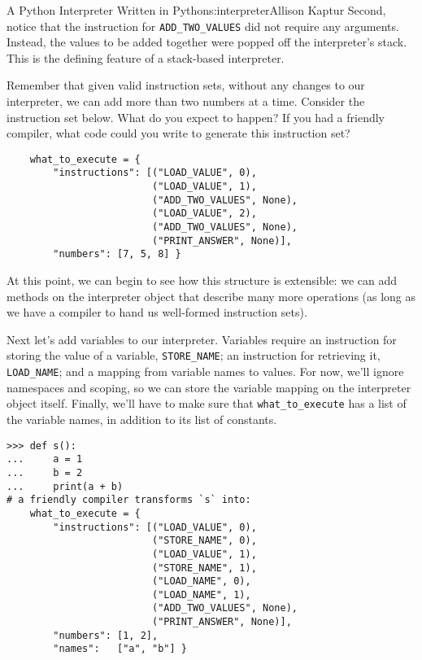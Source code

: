 \begin{aosachapter}{A Python Interpreter Written in Python}{s:interpreter}{Allison Kaptur}
Second, notice that the instruction for \texttt{ADD\_TWO\_VALUES} did
not require any arguments. Instead, the values to be added together were
popped off the interpreter's stack. This is the defining feature of a
stack-based interpreter.

Remember that given valid instruction sets, without any changes to our
interpreter, we can add more than two numbers at a time. Consider the
instruction set below. What do you expect to happen? If you had a
friendly compiler, what code could you write to generate this
instruction set?

\begin{verbatim}
    what_to_execute = {
        "instructions": [("LOAD_VALUE", 0),
                         ("LOAD_VALUE", 1),
                         ("ADD_TWO_VALUES", None),
                         ("LOAD_VALUE", 2),
                         ("ADD_TWO_VALUES", None),
                         ("PRINT_ANSWER", None)],
        "numbers": [7, 5, 8] }
\end{verbatim}

At this point, we can begin to see how this structure is extensible: we
can add methods on the interpreter object that describe many more
operations (as long as we have a compiler to hand us well-formed
instruction sets).

\label{variables}

Next let's add variables to our interpreter. Variables require an
instruction for storing the value of a variable, \texttt{STORE\_NAME};
an instruction for retrieving it, \texttt{LOAD\_NAME}; and a mapping
from variable names to values. For now, we'll ignore namespaces and
scoping, so we can store the variable mapping on the interpreter object
itself. Finally, we'll have to make sure that \texttt{what\_to\_execute}
has a list of the variable names, in addition to its list of constants.

\begin{verbatim}
>>> def s():
...     a = 1
...     b = 2
...     print(a + b)
# a friendly compiler transforms `s` into:
    what_to_execute = {
        "instructions": [("LOAD_VALUE", 0),
                         ("STORE_NAME", 0),
                         ("LOAD_VALUE", 1),
                         ("STORE_NAME", 1),
                         ("LOAD_NAME", 0),
                         ("LOAD_NAME", 1),
                         ("ADD_TWO_VALUES", None),
                         ("PRINT_ANSWER", None)],
        "numbers": [1, 2],
        "names":   ["a", "b"] }
\end{verbatim}


\end{aosachapter}
